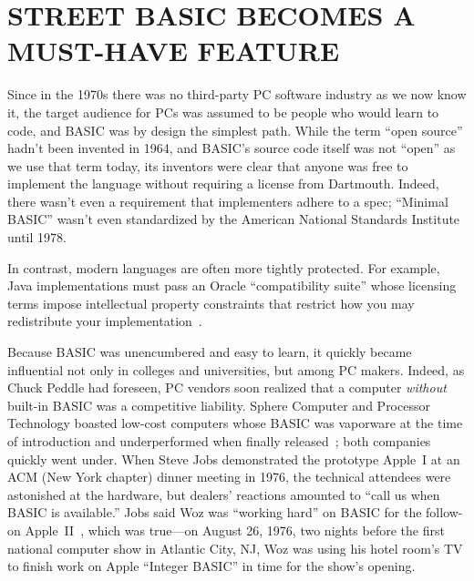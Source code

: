 
\section{STREET BASIC BECOMES A MUST-HAVE FEATURE}


Since in the 1970s there was no third-party PC software industry as we
now know it, the target audience for PCs was assumed to be people who
would learn to code, and BASIC was by design the simplest path.
While the term ``open source'' hadn't been invented in 1964, and BASIC's
source code itself was not ``open'' as we use that term today, its
inventors were clear that anyone was free to implement the language
without requiring a license from Dartmouth.
Indeed, there wasn't even a requirement that implementers adhere to a
spec; ``Minimal BASIC'' wasn't even standardized by the American
National Standards Institute until 1978.

\begin{tangent}{}
In contrast, modern languages are often more tightly protected.
For example, Java implementations must pass an Oracle ``compatibility
suite'' whose licensing terms impose intellectual property constraints
that restrict how you may redistribute your
implementation~\cite{apache-java-letter,apache-resigns-jcp}.
\end{tangent}

Because BASIC was unencumbered and easy to learn, it quickly became
influential not only in colleges 
and universities, but among PC makers. 
Indeed, as Chuck Peddle had foreseen, PC vendors soon realized that a
computer \emph{without} 
built-in BASIC was a competitive liability.
Sphere Computer and Processor Technology boasted low-cost computers
whose BASIC was vaporware at the time of introduction and underperformed
when finally released~\cite[p. 114, 134]{veit}; both companies quickly
went under.
When Steve Jobs demonstrated the prototype Apple~I at an ACM (New York
chapter) dinner meeting in 1976, the technical attendees were astonished at the
hardware, but dealers' reactions amounted to ``call us when BASIC is
available.''
Jobs said Woz was ``working hard'' on BASIC for the follow-on
Apple~II~\cite[pp. 92ff]{veit}, which 
was true---on August 26, 1976, two nights before the first national computer show in
Atlantic City, NJ, Woz was using his hotel room's TV to finish work on
Apple ``Integer BASIC'' in time for the show's opening.

